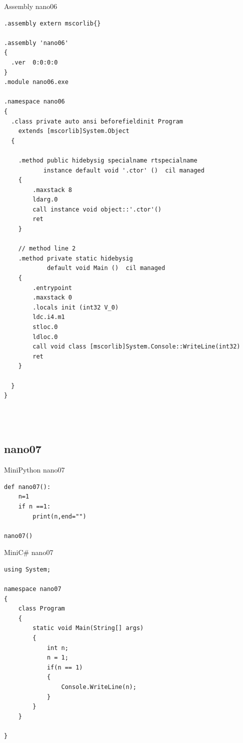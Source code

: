 \documentclass{article}
\begin{document}
Assembly nano06
\begin{lstlisting}
.assembly extern mscorlib{}

.assembly 'nano06'
{
  .ver  0:0:0:0
}
.module nano06.exe

.namespace nano06
{
  .class private auto ansi beforefieldinit Program
  	extends [mscorlib]System.Object
  {

    .method public hidebysig specialname rtspecialname 
           instance default void '.ctor' ()  cil managed 
    {
	    .maxstack 8
	    ldarg.0 
	    call instance void object::'.ctor'()
	    ret 
    } 

    // method line 2
    .method private static hidebysig 
            default void Main ()  cil managed 
    {
	    .entrypoint
	    .maxstack 0
	    .locals init (int32	V_0)
	    ldc.i4.m1
	    stloc.0
	    ldloc.0
	    call void class [mscorlib]System.Console::WriteLine(int32)
	    ret 
    } 

  } 
}
\end{lstlisting}\\\\





\subsection{nano07}

MiniPython nano07
\begin{lstlisting}
def nano07():
    n=1
    if n ==1:
        print(n,end="")

nano07()
\end{lstlisting}

MiniC\# nano07
\begin{lstlisting}
using System;

namespace nano07
{
	class Program
	{
		static void Main(String[] args)
		{
			int n;
			n = 1;
			if(n == 1)
			{	
				Console.WriteLine(n);
			}
		}
	}

}
\end{lstlisting}
\end{document}
